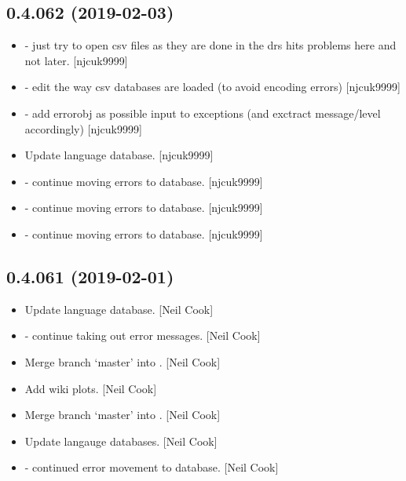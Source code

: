 \documentclass[a4paper,10pt,english]{report}
\begin{document}
\subsection{0.4.062 (2019-02-03)}
\label{\detokenize{misc/changelog:id198}}\begin{itemize}
\item {} 
 - just try to open csv files as they are done in the
drs \textendash{} hits problems here and not later. {[}njcuk9999{]}

\item {} 
 - edit the way csv databases are loaded (to avoid encoding
errors) {[}njcuk9999{]}

\item {} 
 - add errorobj as possible input to exceptions (and
exctract message/level accordingly) {[}njcuk9999{]}

\item {} 
Update language database. {[}njcuk9999{]}

\item {} 
 - continue moving errors to database. {[}njcuk9999{]}

\item {} 
 - continue moving errors to database. {[}njcuk9999{]}

\item {} 
 - continue moving errors to database. {[}njcuk9999{]}

\end{itemize}


\subsection{0.4.061 (2019-02-01)}
\label{\detokenize{misc/changelog:id199}}\begin{itemize}
\item {} 
Update language database. {[}Neil Cook{]}

\item {} 
 - continue taking out error messages. {[}Neil Cook{]}

\item {} 
Merge branch ‘master’ into . {[}Neil Cook{]}

\item {} 
Add wiki plots. {[}Neil Cook{]}

\item {} 
Merge branch ‘master’ into . {[}Neil Cook{]}

\item {} 
Update langauge databases. {[}Neil Cook{]}

\item {} 
 - continued error movement to database. {[}Neil Cook{]}

\end{itemize}
\end{document}
